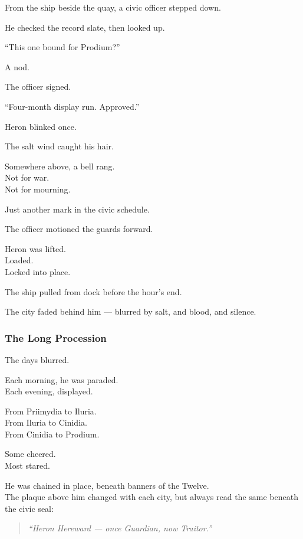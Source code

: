 \documentclass[12pt]{article}
\begin{document}
From the ship beside the quay, a civic officer stepped down.

He checked the record slate, then looked up.

“This one bound for Prodium?”

A nod.

The officer signed.

“Four-month display run. Approved.”

\vspace{1em}

Heron blinked once.

The salt wind caught his hair.

Somewhere above, a bell rang.\\
Not for war.\\
Not for mourning.

Just another mark in the civic schedule.

\vspace{1em}

The officer motioned the guards forward.

Heron was lifted.\\
Loaded.\\
Locked into place.

The ship pulled from dock before the hour’s end.

The city faded behind him — blurred by salt, and blood, and silence.

\dotfill

\subsubsection{The Long Procession}

The days blurred.

Each morning, he was paraded.\\
Each evening, displayed.

From Priimydia to Iluria.\\
From Iluria to Cinidia.\\
From Cinidia to Prodium.

Some cheered.\\
Most stared.

He was chained in place, beneath banners of the Twelve.\\
The plaque above him changed with each city, but always read the same beneath the civic seal:

\begin{quote}
\textit{“Heron Hereward — once Guardian, now Traitor.”}
\end{quote}
\end{document}
